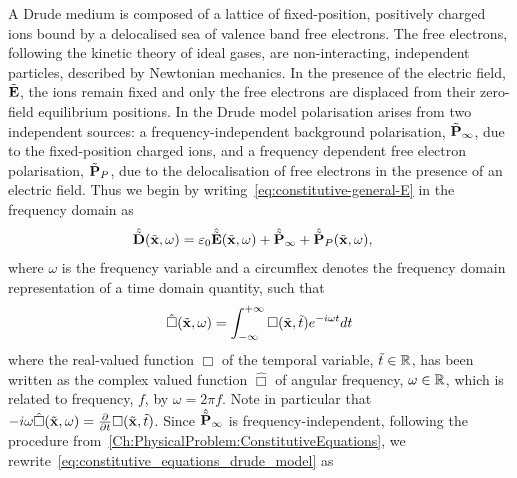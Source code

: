 %
%
A Drude medium is composed of a lattice of fixed-position, positively charged
ions bound by a delocalised sea of valence band free
electrons\cite{Ashcroft:2005wp,Bandyopadhyay:1503732}. The free electrons,
following the kinetic theory of ideal gases, are non-interacting, independent
particles, described by Newtonian mechanics. In the presence of the electric
field, $\tilde{\mathbf{E}}$, the ions remain fixed and only the free electrons are
displaced from their zero-field equilibrium positions. In the Drude model
polarisation arises from two independent sources: a frequency-independent
background polarisation, $\tilde{\mathbf{P}}_{\infty}$, due to the fixed-position charged ions,
and a frequency dependent free electron polarisation, $\tilde{\mathbf{P}}_P$, due to the
delocalisation of free electrons in the presence of an electric field. Thus we
begin by writing~\eqref{eq:constitutive-general-E} in the frequency domain as
\begin{align}
  \hat{\tilde{\mathbf{D}}}(\tilde{\mathbf{x}},\omega) &= \varepsilon_0 \hat{\tilde{\mathbf{E}}}(\tilde{\mathbf{x}}, \omega) + \hat{\tilde{\mathbf{P}}}_{\infty} + \hat{\tilde{\mathbf{P}}}_P(\tilde{\mathbf{x}},\omega) ,
                                    \label{eq:constitutive_equations_drude_model}
\end{align}
where $\omega$ is the frequency variable and a circumflex denotes the frequency
domain representation of a time domain quantity, such that
$$
\hat{\Box}(\tilde{\mathbf{x}},\omega) = \int_{-\infty}^{+\infty} \Box(\tilde{\mathbf{x}},\tilde{t})
e^{-i \omega t} dt
$$
where the real-valued function $\Box$ of the temporal variable, $\tilde{t} \in
\mathbb{R}$, has been written as the complex valued function $\hat{\Box}$ of angular
frequency, $\omega \in \mathbb{R}$, which is related to frequency, $f$, by $\omega =
2 \pi f$. Note in particular that $- i \omega \hat{\Box}(\tilde{\mathbf{x}},\omega) =
\frac{\partial}{\partial t}  \Box(\tilde{\mathbf{x}},\tilde{t})$. Since $\hat{\tilde{\mathbf{P}}}_{\infty}$ is
frequency-independent, following the procedure
from~\autoref{Ch:PhysicalProblem:ConstitutiveEquations}, we
rewrite~\eqref{eq:constitutive_equations_drude_model} as
